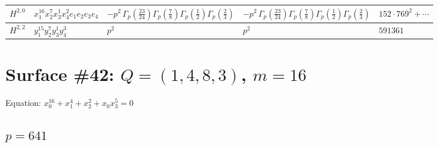 \documentclass[11pt]{article}
\begin{document}
\begin{table}[ht]
{\begin{tabular}{@{}lllll@{}}
\midrule
$H^{2,0}$ & $x_{1}^{16} x_{2}^{7} x_{3}^{1} x_{4}^{2}  e_{1} e_{2} e_{3} e_{4}$ & $- p^{2} \, \Gamma_p \left( \frac{23}{24} \right) \Gamma_p \left( \frac{7}{8} \right) \Gamma_p \left( \frac{1}{2} \right) \Gamma_p \left( \frac{2}{3} \right)$ & $- p^{2} \, \Gamma_p \left( \frac{23}{24} \right) \Gamma_p \left( \frac{7}{8} \right) \Gamma_p \left( \frac{1}{2} \right) \Gamma_p \left( \frac{2}{3} \right)$ & $152{\cdot}769^{2}{+}\cdots$ \\
\midrule
$H^{2,2}$ & $y_{1}^{15} y_{2}^{7} y_{3}^{1} y_{4}^{3}$ & $p^{2} \,$ & $p^{2} \,$ & $591361$ \\
\bottomrule
\end{tabular}
}
\renewcommand{\arraystretch}{1.0}
\end{table}

\newpage

\section*{Surface \#42: $Q=(1, 4, 8, 3)$, $m=16$}

Equation: $x_0^{16} + x_1^{4} + x_2^{2} + x_0 x_3^{5} = 0$

\subsection*{$p = 641$}
\end{document}
